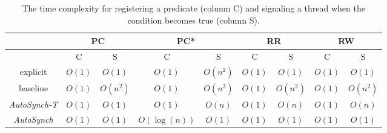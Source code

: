 \documentclass[preprint]{sigplanconf}
\begin{document}
\begin{table}[ht!]
   \centering
   \begin{tabular}{|c||c|c||c|c||c|c||c|c|}
      \hline 
      & \multicolumn{2}{c||}{PC} & \multicolumn{2}{c||}{PC*} & 
        \multicolumn{2}{c||}{RR} & \multicolumn{2}{c|}{RW} \\
      \hline
         & C & S & C & S & C & S & C & S \\
      \hline 
      \hline 
      explicit & $O(1)$ & $O(1)$ & $O(1)$ & $O(n^2)$ & $O(1)$ & $O(1)$ & $O(1)$ &
      $O(1)$ \\
      \hline 
      baseline & $O(1)$ & $O(n^2)$ & $O(1)$ & $O(n^2)$ & $O(1)$ & $O(n^2)$ &
      $O(1)$ & $O(n^2)$ \\
      \hline 
      {\em  AutoSynch-T} & $O(1)$ & $O(1)$ & $O(1)$ & $O(n)$ & $O(1)$ & $O(n)$ & $O(1)$ 
      & $O(n)$ \\
      \hline 
      {\em AutoSynch} & $O(1)$ & $O(1)$ & $O(\log(n))$ & $O(1)$ & $O(1)$ & $O(1)$ & 
      $O(1)$ & $O(1)$\\
      \hline 
   \end{tabular}
   \caption{The time complexity for registering a predicate (column C) and signaling a thread when the condition becomes true
   (column S).}
   \label{tab:complexity}
\end{table}



%
\end{document}

